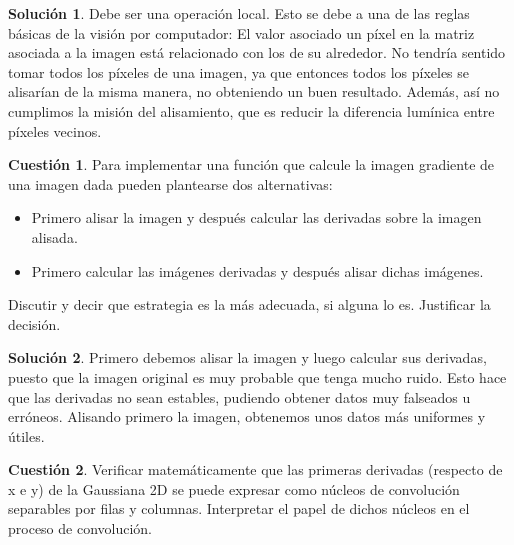\documentclass[a4paper, 11pt]{article}
\theoremstyle{definition}
\newtheorem{cuestion}{Cuestión}
\newtheorem*{solucion}{Solución}
\begin{document}
  \begin{solucion}
      Debe ser una operación local. Esto se debe a una de las reglas básicas de la
      visión por computador: El valor asociado un píxel en la matriz asociada a la imagen
      está relacionado con los de su alrededor.
      No tendría sentido tomar todos los píxeles de una imagen,
      ya que entonces todos los píxeles se alisarían de la misma manera, no obteniendo
      un buen resultado. Además, así no cumplimos la misión del alisamiento, que
      es reducir la diferencia lumínica entre píxeles vecinos.
  \end{solucion}

  \begin{cuestion}
      Para implementar una función que calcule la imagen gradiente de una
      imagen dada pueden plantearse dos alternativas:
      \begin{itemize}
      	\item Primero alisar la imagen y después calcular las derivadas sobre la imagen alisada.
      	\item Primero calcular las imágenes derivadas y después alisar dichas imágenes.
      \end{itemize}
      Discutir y decir que estrategia es la más adecuada, si alguna lo es. Justificar la decisión.

  \end{cuestion}

  \begin{solucion}
      Primero debemos alisar la imagen y luego calcular sus derivadas, puesto que la imagen
      original es muy probable que tenga mucho ruido. Esto hace que las derivadas no
      sean estables, pudiendo obtener datos muy falseados u erróneos. Alisando primero la
      imagen, obtenemos unos datos más uniformes y útiles.
  \end{solucion}

  \begin{cuestion}
  	Verificar matemáticamente que las primeras derivadas (respecto de x
  	e y) de la Gaussiana 2D se puede expresar como núcleos de convolución
  	separables por filas y columnas. Interpretar el papel de dichos núcleos
  	en el proceso de convolución.
  \end{cuestion}
\end{document}
